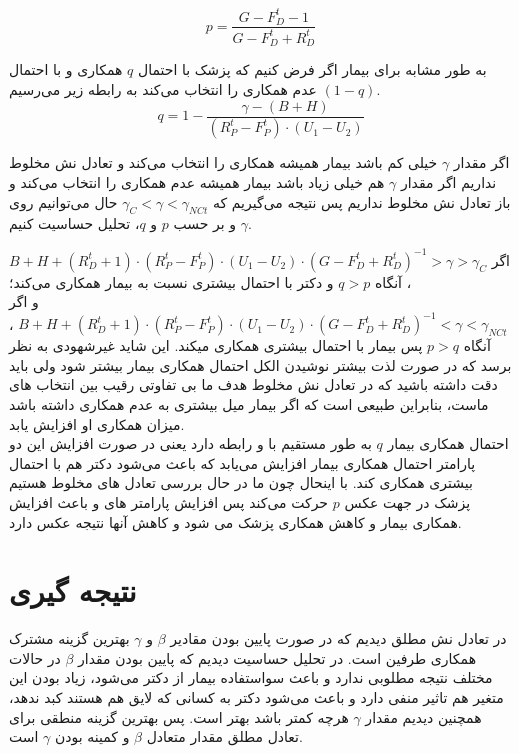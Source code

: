 \documentclass[12pt]{article}
\begin{document}
{{{{{{{{\[
p = \frac{G - F_D^t - 1}{G - F_D^t + R_D^t}
\]

به طور مشابه برای بیمار اگر فرض کنیم که پزشک با احتمال $q$ همکاری و با احتمال $(1-q) $ عدم همکاری را انتخاب می‌کند به رابطه زیر می‌رسیم.
\[
q = 1 - \frac{\gamma - (B + H)}{(R_P^t - F_P^t) \cdot (U_1 - U_2)}
\]

اگر مقدار $\gamma$ خیلی کم باشد بیمار همیشه همکاری را انتخاب می‌کند و تعادل نش مخلوط نداریم اگر مقدار $\gamma$ هم خیلی زیاد باشد بیمار همیشه عدم همکاری را انتخاب می‌کند و باز تعادل نش مخلوط نداریم پس نتیجه می‌گیریم که $\gamma_{C} < \gamma < \gamma_{NCt} $ حال می‌توانیم روی $\gamma$ و  بر حسب $ p$ و $q$، تحلیل حساسیت کنیم.

اگر $  B + H + (R_D^t+1) \cdot (R_P^t-F_P^t) \cdot (U_1-U_2) \cdot  (G-F_D^t+R_D^t)^{-1} > \gamma > \gamma _{C}  $ ، آنگاه $ q>p $ و دکتر با احتمال بیشتری نسبت به بیمار همکاری می‌کند؛\\ و
اگر$ B + H +(R_D^t+1) \cdot (R_P^t-F_P^t) \cdot (U_1-U_2) \cdot  (G-F_D^t+R_D^t)^{-1} < \gamma < \gamma_{NCt} $ ، آنگاه $p>q $ پس بیمار با احتمال بیشتری همکاری میکند.
این شاید غیرشهودی به نظر برسد که در صورت لذت بیشتر نوشیدن الکل احتمال همکاری بیمار بیشتر شود ولی باید دقت داشته باشید که در تعادل نش مخلوط هدف ما بی تفاوتی رقیب بین انتخاب های ماست، بنابراین طبیعی است که اگر بیمار میل بیشتری به عدم همکاری داشته باشد میزان همکاری او افزایش یابد.\\

احتمال همکاری بیمار $q$ به طور مستقیم با  و  رابطه دارد یعنی در صورت افزایش این دو پارامتر احتمال همکاری بیمار افزایش می‌یابد که باعث می‌شود دکتر هم با احتمال بیشتری همکاری کند. با اینحال چون ما در حال بررسی  تعادل های مخلوط هستیم پزشک در جهت عکس $p$ حرکت می‌کند پس افزایش پارامتر های  و  باعث افزایش همکاری بیمار و کاهش همکاری پزشک می شود و کاهش آنها نتیجه عکس دارد.

\section{نتیجه گیری}

در تعادل نش مطلق دیدیم که در صورت پایین بودن مقادیر $\beta$ و $\gamma$ بهترین گزینه مشترک همکاری طرفین است.
در تحلیل حساسیت دیدیم که پایین بودن مقدار $\beta$ در حالات مختلف نتیجه مطلوبی ندارد و باعث سواستفاده بیمار از دکتر می‌شود، زیاد بودن این متغیر هم تاثیر منفی دارد و باعث می‌شود دکتر به کسانی که لایق هم هستند کبد ندهد، همچنین دیدیم مقدار $\gamma$ هرچه کمتر باشد بهتر است. پس بهترین گزینه منطقی برای تعادل مطلق مقدار متعادل $\beta$ و کمینه بودن $\gamma$  است.\\

}}}}}}}}
\end{document}
